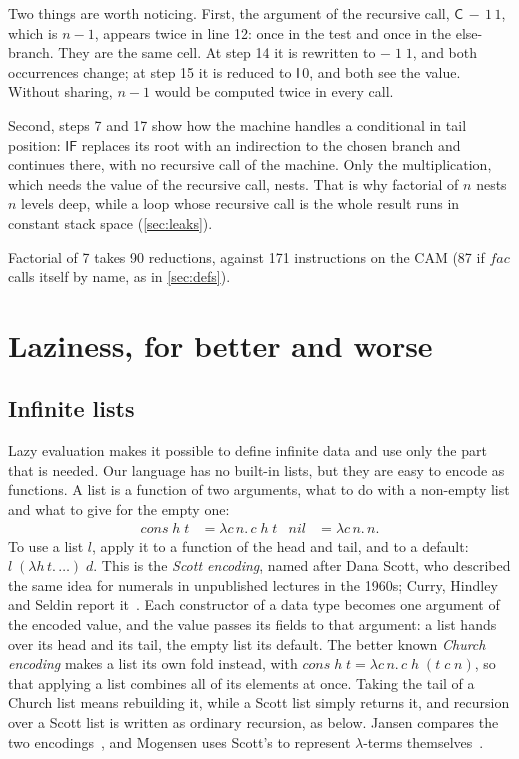 \documentclass[11pt,a4paper]{article}
\newcommand{\cmb}[1]{\textsf{#1}}
\newcommand{\I}{\cmb{I}}
\newcommand{\C}{\cmb{C}}
\newcommand{\IF}{\cmb{IF}}
\theoremstyle{definition}
\theoremstyle{plain}
\begin{document}
Two things are worth noticing. First, the argument of the recursive call,
$\C\,{-}\,1\,1$, which is $n - 1$, appears twice in line 12: once in the test
and once in the else-branch. They are the same cell. At step 14 it is
rewritten to ${-}\;1\;1$, and both occurrences change; at step 15 it is
reduced to $\I\,0$, and both see the value. Without sharing, $n-1$ would be
computed twice in every call.

Second, steps 7 and 17 show how the machine handles a conditional in tail
position: $\IF$ replaces its root with an indirection to the chosen branch
and continues there, with no recursive call of the machine. Only the
multiplication, which needs the value of the recursive call, nests. That is
why factorial of $n$ nests $n$ levels deep, while a loop whose recursive call
is the whole result runs in constant stack space (\cref{sec:leaks}).

Factorial of 7 takes 90 reductions, against 171 instructions on the CAM
(87 if $\mathit{fac}$ calls itself by name, as in \cref{sec:defs}).

\section{Laziness, for better and worse}\label{sec:laziness}

\subsection{Infinite lists}

Lazy evaluation makes it possible to define infinite data and use only the
part that is needed. Our language has no built-in lists, but they are easy
to encode as functions. A list is a function of two arguments, what to do with
a non-empty list and what to give for the empty one:
\begin{align*}
  \mathit{cons}\;h\;t &= \lambda c\,n.\,c\;h\;t &
  \mathit{nil} &= \lambda c\,n.\,n.
\end{align*}
To use a list $l$, apply it to a function of the head and tail, and to a
default: $l\;(\lambda h\,t.\,\ldots)\;d$. This is the \emph{Scott encoding},
named after Dana Scott, who described the same idea for numerals in
unpublished lectures in the 1960s; Curry, Hindley and Seldin report
it~\cite{chs72}. Each constructor of a data type becomes one argument of the
encoded value, and the value passes its fields to that argument: a list
hands over its head and its tail, the empty list its default. The better
known \emph{Church encoding} makes a list its own fold instead, with
$\mathit{cons}\;h\;t = \lambda c\,n.\,c\;h\;(t\;c\;n)$, so that applying a
list combines all of its elements at once. Taking the tail of a Church list
means rebuilding it, while a Scott list simply returns it, and recursion
over a Scott list is written as ordinary recursion, as below. Jansen compares
the two encodings~\cite{jansen13}, and Mogensen uses Scott's to represent
$\lambda$-terms themselves~\cite{mogensen92}.
\end{document}
